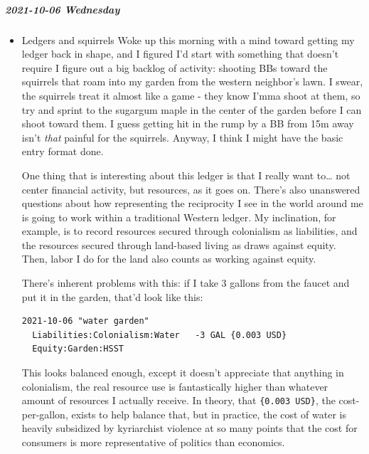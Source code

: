 \documentclass[11pt]{article}
\begin{document}
\subparagraph*{2021-10-06 Wednesday}
\label{sec:org10f807d}
\begin{itemize}
\item Ledgers and squirrels
\label{sec:orgea07eb2}
Woke up this morning with a mind toward getting my ledger back in shape, and I figured I'd start with something that doesn't require I figure out a big backlog of activity: shooting BBs toward the squirrels that roam into my garden from the western neighbor's lawn. I swear, the squirrels treat it almost like a game - they know I'mma shoot at them, so try and sprint to the sugargum maple in the center of the garden before I can shoot toward them. I guess getting hit in the rump by a BB from 15m away isn't \emph{that} painful for the squirrels. Anyway, I think I might have the basic entry format done.

One thing that is interesting about this ledger is that I really want to\ldots{} not center financial activity, but resources, as it goes on. There's also unanswered questions about how representing the reciprocity I see in the world around me is going to work within a traditional Western ledger. My inclination, for example, is to record resources secured through colonialism as liabilities, and the resources secured through land-based living as draws against equity. Then, labor I do for the land also counts as working against equity.

There's inherent problems with this: if I take 3 gallons from the faucet and put it in the garden, that'd look like this:

\begin{verbatim}
2021-10-06 "water garden"
  Liabilities:Colonialism:Water   -3 GAL {0.003 USD}
  Equity:Garden:HSST
\end{verbatim}

This looks balanced enough, except it doesn't appreciate that anything in colonialism, the real resource use is fantastically higher than whatever amount of resources I actually receive. In theory, that \texttt{\{0.003 USD\}}, the cost-per-gallon, exists to help balance that, but in practice, the cost of water is heavily subsidized by kyriarchist violence at so many points that the cost for consumers is more representative of politics than economics.


\end{itemize}
\end{document}
